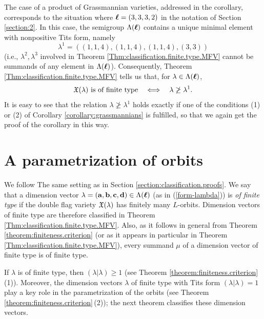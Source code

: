 \documentclass[12pt,reqno]{amsart}
\begin{document}
\begin{remark}
The case of a product of Grassmannian varieties, addressed in the corollary,
corresponds to the situation where
$\boldsymbol{\ell}=(3,3,3,2)$ in the notation of Section \ref{section:2}.
In this case, the semigroup $\Lambda(\boldsymbol{\ell})$ contains a unique minimal element with nonpositive Tits form, namely
$$
\lambda^1=((1,1,4),(1,1,4),(1,1,4),(3,3))
$$
(i.e., $\lambda^2,\lambda^3$ involved in Theorem \ref{Thm:classification.finite.type.MFV} cannot be summands of any element in $\Lambda(\boldsymbol{\ell})$).
Consequently, Theorem \ref{Thm:classification.finite.type.MFV} tells us that, for $\lambda\in\Lambda(\boldsymbol{\ell})$,
$$
\mbox{$\mathfrak{X}(\lambda)$ is of finite type}
\quad\Longleftrightarrow\quad
\lambda\not\geq\lambda^1.
$$
It is easy to see that the relation $\lambda\not\geq\lambda^1$ holds exactly if one of the conditions (1) or (2) of Corollary \ref{corollary:grassmannians} is fulfilled, so that we again get the proof of the corollary in this way.
\end{remark}


\section{A parametrization of orbits}\label{section:4}

We follow The same setting as in Section \ref{section:classification.proofs}.
We say that a dimension vector $\lambda=(\mathbf{a},\mathbf{b},\mathbf{c},\mathbf{d})\in\Lambda(\boldsymbol{\ell})$ (as in (\ref{form-lambda})) is {\it of finite type} if the double flag variety $\mathfrak{X}(\lambda)$ has finitely many $L$-orbits. Dimension vectors of finite type are therefore classified in Theorem \ref{Thm:classification.finite.type.MFV}.
Also, as it follows in general from Theorem \ref{theorem:finiteness.criterion}
(or as it appears in particular in Theorem \ref{Thm:classification.finite.type.MFV}), every summand $\mu$ of a dimension vector of finite type is of finite type.

If $\lambda$ is of finite type, then $(\lambda|\lambda)\geq 1$
(see Theorem \ref{theorem:finiteness.criterion}\,(1)).
Moreover, the dimension vectors $\lambda$ of finite type with Tits form $(\lambda|\lambda)=1$ play a key role in the parametrization of the orbits (see Theorem \ref{theorem:finiteness.criterion}\,(2));
the next theorem classifies these dimension vectors.
\end{document}
